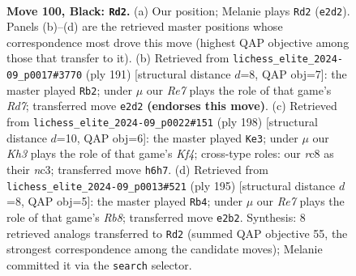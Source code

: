 \documentclass[11pt]{article}
\begin{document}
\clearpage

\begin{figure}[p]\centering
\begin{subfigure}{0.46\textwidth}\centering
\resizebox{\linewidth}{!}{%
\newchessgame
\chessboard[
  setfen={2R5/6p1/N4p1k/7p/7P/6PK/4r3/8 b - - 25 100},
  showmover=false,
  pgfstyle=straightmove, color=movearrow, markmove={e2-d2}
]}
\caption{}
\end{subfigure}\hfill
\begin{subfigure}{0.46\textwidth}\centering
\resizebox{\linewidth}{!}{%
\newchessgame
\chessboard[
  setfen={8/R7/6pk/7p/7P/6PK/3r4/8 b - - 29 96},
  showmover=false,
  pgfstyle=straightmove, color=movearrow, markmove={d2-b2}
]}
\caption{}
\end{subfigure}
\\[4pt]
\begin{subfigure}{0.46\textwidth}\centering
\resizebox{\linewidth}{!}{%
\newchessgame
\chessboard[
  setfen={8/5k2/6p1/4P2p/3N1K1P/2n3P1/8/8 w - - 7 100},
  showmover=false,
  pgfstyle=straightmove, color=movearrow, markmove={f4-e3}
]}
\caption{}
\end{subfigure}\hfill
\begin{subfigure}{0.46\textwidth}\centering
\resizebox{\linewidth}{!}{%
\newchessgame
\chessboard[
  setfen={2R5/8/6pk/7p/7P/5PP1/5K2/1r6 b - - 6 98},
  showmover=false,
  pgfstyle=straightmove, color=movearrow, markmove={b1-b4}
]}
\caption{}
\end{subfigure}
\caption{\textbf{Move 100, Black: \texttt{Rd2}.} (a) Our position; Melanie plays \texttt{Rd2} (\texttt{e2d2}). Panels (b)--(d) are the retrieved master positions whose correspondence most drove this move (highest QAP objective among those that transfer to it). (b) Retrieved from \texttt{lichess\_elite\_2024-09\_p0017\#3770} (ply 191) [structural distance $d$=8, QAP obj=7]: the master played \texttt{Rb2}; under $\mu$ our \emph{Re7} plays the role of that game's \emph{Rd7}; transferred move \texttt{e2d2} \textbf{(endorses this move)}. (c) Retrieved from \texttt{lichess\_elite\_2024-09\_p0022\#151} (ply 198) [structural distance $d$=10, QAP obj=6]: the master played \texttt{Ke3}; under $\mu$ our \emph{Kh3} plays the role of that game's \emph{Kf4}; cross-type roles: our \emph{r}c8 as their \emph{n}c3; transferred move \texttt{h6h7}. (d) Retrieved from \texttt{lichess\_elite\_2024-09\_p0013\#521} (ply 195) [structural distance $d$=8, QAP obj=5]: the master played \texttt{Rb4}; under $\mu$ our \emph{Re7} plays the role of that game's \emph{Rb8}; transferred move \texttt{e2b2}. Synthesis: 8 retrieved analogs transferred to \texttt{Rd2} (summed QAP objective 55, the strongest correspondence among the candidate moves); Melanie committed it via the \texttt{search} selector.}
\label{fig:thought-m199}
\end{figure}
\end{document}
